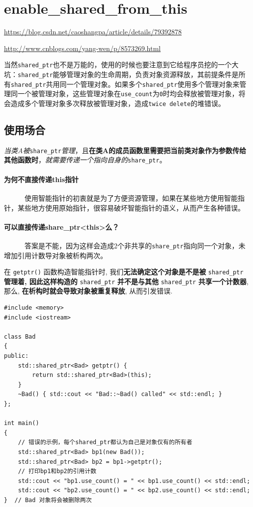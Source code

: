 \documentclass[UTF8,a4paper,12pt]{ctexbook}
\begin{document}
\section{enable\_shared\_from\_this}
	\url{https://blog.csdn.net/caoshangpa/article/details/79392878}
	
	\url{http://www.cnblogs.com/yang-wen/p/8573269.html}
	
	当然\verb|shared_ptr|也不是万能的，使用的时候也要注意到它给程序员挖的一个大坑：\verb|shared_ptr|能够管理对象的生命周期，负责对象资源释放，其前提条件是所有\verb|shared_ptr|共用同一个管理对象。如果多个\verb|shared_ptr|使用多个管理对象来管理同一个被管理对象，这些管理对象在\verb|use_count|为\verb|0|时均会释放被管理对象，将会造成多个管理对象多次释放被管理对象，造成\verb|twice delete|的堆错误。
	
	\subsection{使用场合}
		\textit{当类A被}\verb|share_ptr|\textit{管理}，且\textbf{在类A的成员函数里需要把当前类对象作为参数传给其他函数时}，\textit{就需要传递一个指向自身的}\verb|share_ptr|。
		
		\paragraph{为何不直接传递this指针}
		
		       使用智能指针的初衷就是为了方便资源管理，如果在某些地方使用智能指针，某些地方使用原始指针，很容易破坏智能指针的语义，从而产生各种错误。
		
		\paragraph{可以直接传递share\_ptr<this>么？}
		
		       答案是不能，因为这样会造成2个非共享的\verb|share_ptr|指向同一个对象，未增加引用计数导对象被析构两次。
	
				在 \verb|getptr()| 函数构造智能指针时, 我们\textbf{无法确定这个对象是不是被} \verb|shared_ptr| \textbf{管理着, 因此这样构造的} \verb|shared_ptr| \textbf{并不是与其他} \verb|shared_ptr| \textbf{共享一个计数器}, 那么, \textbf{在析构时就会导致对象被重复释放}, 从而引发错误.
				
			\begin{lstlisting}
#include <memory>
#include <iostream>
 
class Bad
{
public:
	std::shared_ptr<Bad> getptr() {
		return std::shared_ptr<Bad>(this);
	}
	~Bad() { std::cout << "Bad::~Bad() called" << std::endl; }
};
 
int main()
{
	// 错误的示例，每个shared_ptr都认为自己是对象仅有的所有者
	std::shared_ptr<Bad> bp1(new Bad());
	std::shared_ptr<Bad> bp2 = bp1->getptr();
	// 打印bp1和bp2的引用计数
	std::cout << "bp1.use_count() = " << bp1.use_count() << std::endl;
	std::cout << "bp2.use_count() = " << bp2.use_count() << std::endl;
}  // Bad 对象将会被删除两次			
			\end{lstlisting}
			
\end{document}
